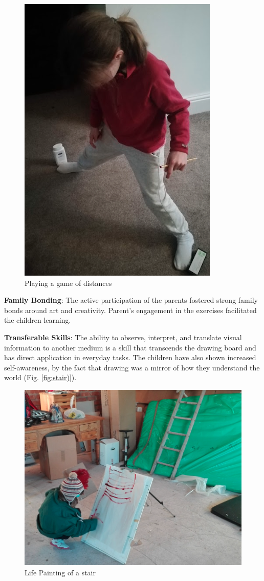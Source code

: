 \documentclass{article}
\begin{document}
\begin{figure}
    \centering
    \includegraphics[width=0.5\linewidth]{Screenshot 2025-01-06 at 08.42.04.png}
    \caption{Playing a game of distances}
    \label{fig:distances}
\end{figure}

\textbf{Family Bonding}: The active participation of the parents fostered strong family bonds around art and creativity. Parent’s engagement in the exercises facilitated the children learning.

\textbf{Transferable Skills}: The ability to observe, interpret, and translate visual information to another medium is a skill that transcends the drawing board and has direct application in everyday tasks. The children have also shown increased self-awareness, by the fact that drawing was a mirror of how they understand the world (Fig. \ref{fig:stair)}).
\begin{figure}
    \centering
    \includegraphics[width=0.5\linewidth]{Screenshot 2025-01-06 at 08.37.46.png}
    \caption{Life Painting of a stair}
    \label{fig:stair}
\end{figure}
\end{document}
